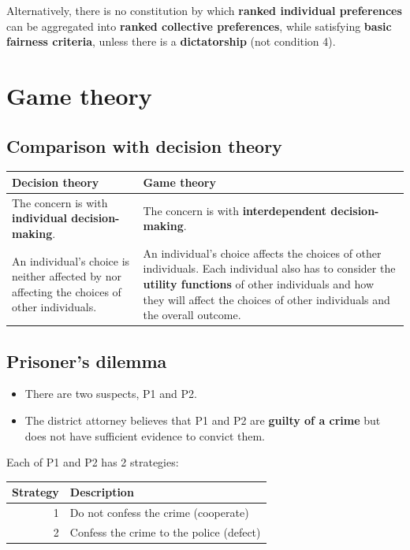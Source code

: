 \documentclass[11pt]{article}
\begin{document}
Alternatively, there is no constitution by which \textbf{ranked individual preferences} can be aggregated into \textbf{ranked collective preferences}, while satisfying \textbf{basic fairness criteria}, unless there is a \textbf{dictatorship} (not condition 4).
\section{Game theory}
\label{sec:org23303f5}

\subsection{Comparison with decision theory}
\label{sec:orgf67a959}
\begin{center}
\begin{tabularx}{\textwidth}{|X|X|}
\hline
Decision theory & Game theory\\
\hline
The concern is with \textbf{individual decision-making}. & The concern is with \textbf{interdependent decision-making}.\\
\hline
An individual's choice is neither affected by nor affecting the choices of other individuals. & An individual's choice affects the choices of other individuals. Each individual also has to consider the \textbf{utility functions} of other individuals and how they will affect the choices of other individuals and the overall outcome.\\
\hline
\end{tabularx}
\end{center}
\subsection{Prisoner's dilemma}
\label{sec:org27c5701}
\begin{itemize}
\item There are two suspects, P1 and P2.
\item The district attorney believes that P1 and P2 are \textbf{guilty of a crime} but does not have sufficient evidence to convict them.
\end{itemize}

Each of P1 and P2 has 2 strategies:
\begin{center}
\begin{tabular}{r|l}
Strategy & Description\\
\hline
1 & Do not confess the crime (cooperate)\\
2 & Confess the crime to the police (defect)\\
\end{tabular}
\end{center}
\end{document}
